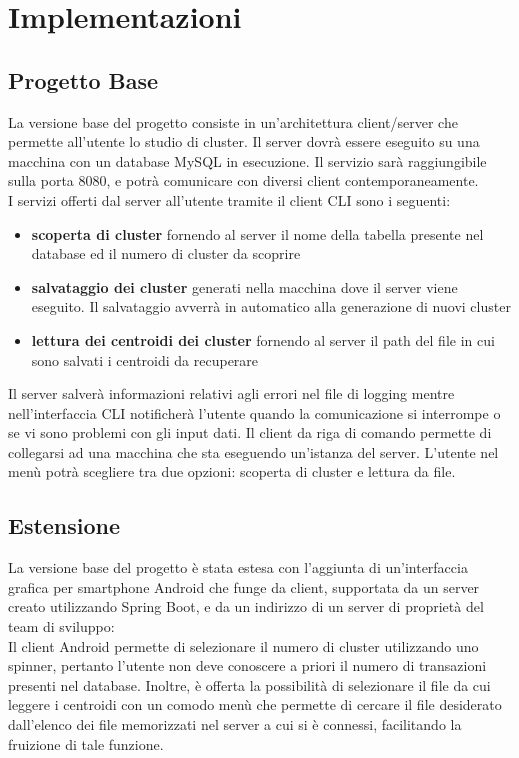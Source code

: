 \section{Implementazioni}
\subsection{Progetto Base}
\noindent La versione base del progetto consiste in un'architettura client/server che permette all'utente lo studio di cluster. Il server dovrà essere eseguito su una macchina con un database MySQL in esecuzione. 
Il servizio sarà raggiungibile sulla porta 8080, e potrà comunicare con diversi client contemporaneamente. 
\\ I servizi offerti dal server all'utente tramite il client CLI sono i seguenti:
\begin{itemize}[label=-]
  \item \textbf{scoperta di cluster} fornendo al server il nome della tabella presente nel database ed il numero di cluster da scoprire
  \item \textbf{salvataggio dei cluster} generati nella macchina dove il server viene eseguito. Il salvataggio avverrà in automatico alla generazione di nuovi cluster
  \item \textbf{lettura dei centroidi dei cluster} fornendo al server il path del file in cui sono salvati i centroidi da recuperare 
\end{itemize}
Il server salverà informazioni relativi agli errori nel file di logging mentre nell'interfaccia CLI notificherà l'utente quando la comunicazione si interrompe o se vi sono problemi con gli input dati. Il client da riga di comando permette di collegarsi ad una macchina che sta eseguendo un'istanza del server. L'utente nel menù potrà scegliere tra due opzioni: scoperta di cluster e lettura da file.

\subsection{Estensione}
\noindent La versione base del progetto è stata estesa con l'aggiunta di un'interfaccia grafica per smartphone Android che funge da client, supportata da un server creato utilizzando Spring Boot, e da un indirizzo di un server di proprietà del team di sviluppo:  \\ Il client Android permette di selezionare il numero di cluster utilizzando uno spinner, pertanto l'utente non deve conoscere a priori il numero di transazioni presenti nel database. Inoltre, è offerta la possibilità di selezionare il file da cui leggere i centroidi con un comodo menù che permette di cercare il file desiderato dall'elenco dei file memorizzati nel server a cui si è connessi, facilitando la fruizione di tale funzione.  